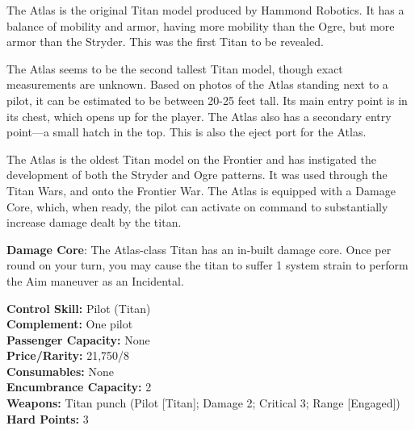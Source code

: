 \documentclass[9pt, openany]{extbook}
\begin{document}
The Atlas is the original Titan model produced by Hammond Robotics. It has a balance of mobility and armor, having more mobility than the Ogre, but more armor than the Stryder. This was the first Titan to be revealed.

The Atlas seems to be the second tallest Titan model, though exact measurements are unknown. Based on photos of the Atlas standing next to a pilot, it can be estimated to be between 20-25 feet tall. Its main entry point is in its chest, which opens up for the player. The Atlas also has a secondary entry point---a small hatch in the top. This is also the eject port for the Atlas.

The Atlas is the oldest Titan model on the Frontier and has instigated the development of both the Stryder and Ogre patterns. It was used through the Titan Wars, and onto the Frontier War. The Atlas is equipped with a Damage Core, which, when ready, the pilot can activate on command to substantially increase damage dealt by the titan.

\textbf{Damage Core}: The Atlas-class Titan has an in-built damage core. Once per round on your turn, you may cause the titan to suffer 1 system strain to perform the Aim maneuver as an Incidental.\\[1em]


\begin{multicols}{2}
\noindent\textbf{Control Skill:} Pilot (Titan)\\
\noindent\textbf{Complement:} One pilot\\
\noindent\textbf{Passenger Capacity:} None\\
\noindent\textbf{Price/Rarity:} 21,750/8\\
\noindent\textbf{Consumables:} None\\
\noindent\textbf{Encumbrance Capacity:} 2\\
\noindent\textbf{Weapons:} Titan punch (Pilot [Titan]; Damage 2; Critical 3; Range [Engaged])\\
\noindent\textbf{Hard Points:} 3
\end{multicols}

\vspace*{\fill}
\pagebreak
\end{document}

